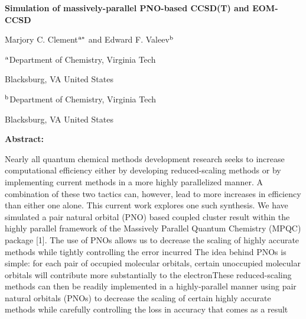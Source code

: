 \documentclass[12pt]{article}
\begin{document}
\centerline{\bf Simulation of massively-parallel PNO-based CCSD(T) and EOM-CCSD}

\vspace{12pt}

\centerline{ {Marjory C. Clement}$^{\rm a*}$ and {Edward F. Valeev}$^{\rm b}$}

\vspace{12pt}

\centerline{$^{\rm a}$Department of Chemistry, Virginia Tech}
\centerline{Blacksburg, VA United States}

\vspace{12pt}

\centerline{$^{\rm b}$Department of Chemistry, Virginia Tech}
\centerline{Blacksburg, VA United States}

\vspace{12pt}

\vspace{24pt}

{\bf Abstract:} 



Nearly all quantum chemical methods development research seeks to increase
computational efficiency either by developing reduced-scaling methods
or by implementing current methods in a more highly parallelized manner.
A combination of these two tactics can, however, lead to more increases
in efficiency than either one alone. This current work explores one such
synthesis. We have simulated a pair natural orbital (PNO) based
coupled cluster result within the highly parallel framework of the
Massively Parallel Quantum Chemistry (MPQC) package [1]. The use of PNOs
allows us to decrease the scaling of highly accurate methods while
tightly controlling the error incurred The idea behind PNOs is simple:
for each pair of occupied molecular orbitals, certain unoccupied
molecular orbitals will contribute more substantially to the electronThese reduced-scaling methods
can then be readily implemented in a highly-parallel manner   using pair natural orbitals (PNOs) to decrease the scaling of
certain highly accurate methods while carefully controlling the loss in
accuracy that comes as a result
\end{document}
